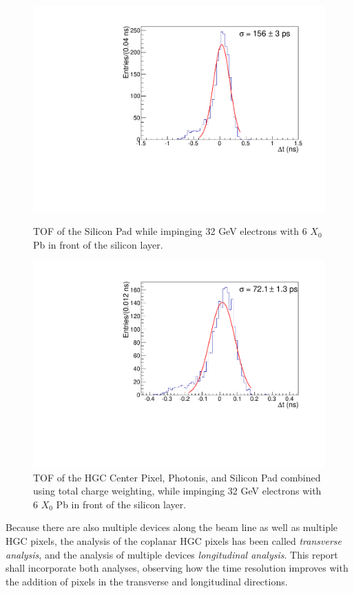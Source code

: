 \documentclass[twocolumn,aps,prd,reprint,superscriptaddress,floatfix]{revtex4-1}
\begin{document}
\begin{figure}[!htb]
	\centering
	\includegraphics[width=\linewidth]{deltaTSiPad.pdf}
	\caption{TOF of the Silicon Pad while impinging 32 GeV electrons with 6 $X_0$ Pb in front of the silicon layer.}
	\label{fig:SiPad}

\centering
	\includegraphics[width=\linewidth]{deltaT_Center_MCP_SiPad_TotalCharge.pdf}
	\caption{TOF of the HGC Center Pixel, Photonis, and Silicon Pad combined using total charge weighting, while impinging 32 GeV electrons with 6 $X_0$ Pb in front of the silicon layer.}
	\label{fig:wctc}
\end{figure}

Because there are also multiple devices along the beam line as well as multiple HGC pixels, the analysis of the coplanar HGC pixels has been called \textit{transverse analysis}, and the analysis of multiple devices \textit{longitudinal analysis}. 
This report shall incorporate both analyses, observing how the time resolution improves with the addition of pixels in the transverse and longitudinal directions.
\end{document}
